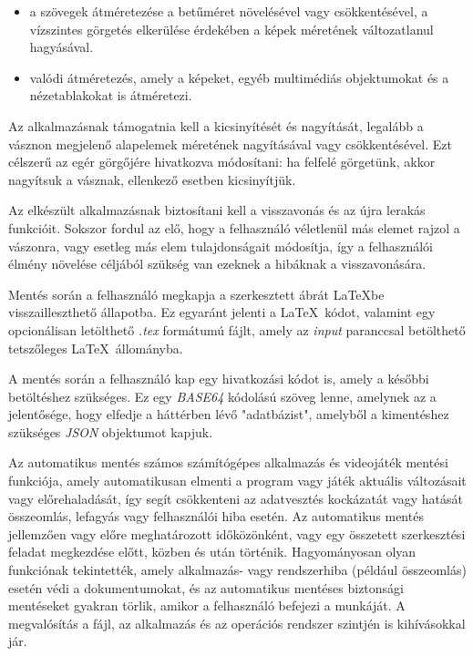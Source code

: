 \begin{itemize}
	\item a szövegek átméretezése a betűméret növelésével vagy csökkentésével, a vízszintes görgetés elkerülése érdekében a képek méretének változatlanul hagyásával.
	\item valódi átméretezés, amely a képeket, egyéb multimédiás objektumokat és a nézetablakokat is átméretezi.
\end{itemize}

Az alkalmazásnak támogatnia kell a kicsinyítését és nagyítását, legalább a vásznon megjelenő alapelemek méretének nagyításával vagy csökkentésével. Ezt célszerű az egér görgőjére hivatkozva módosítani: ha felfelé görgetünk, akkor nagyítsuk a vásznak, ellenkező esetben kicsinyítjük.


Az elkészült alkalmazásnak biztosítani kell a visszavonás és az újra lerakás funkcióit. Sokszor fordul az elő, hogy a felhasználó véletlenül más elemet rajzol a vászonra, vagy esetleg más elem tulajdonságait módosítja, így a felhasználói élmény növelése céljából szükség van ezeknek a hibáknak a visszavonására.



Mentés során a felhasználó megkapja a szerkesztett ábrát \LaTeX\-be visszailleszthető állapotba. Ez egyaránt jelenti a \LaTeX\ kódot, valamint egy opcionálisan letölthető \textit{.tex} formátumú fájlt, amely az \textit{input} paranccsal betölthető tetszőleges \LaTeX\ állományba.

A mentés során a felhasználó kap egy hivatkozási kódot is, amely a későbbi betöltéshez szükséges. Ez egy \textit{BASE64} kódolású szöveg lenne, amelynek az a jelentősége, hogy elfedje a háttérben lévő "adatbázist", amelyből a kimentéshez szükséges \textit{JSON} objektumot kapjuk.


Az automatikus mentés számos számítógépes alkalmazás és videojáték mentési funkciója, amely automatikusan elmenti a program vagy játék aktuális változásait vagy előrehaladását, így segít csökkenteni az adatvesztés kockázatát vagy hatását összeomlás, lefagyás vagy felhasználói hiba esetén. Az automatikus mentés jellemzően vagy előre meghatározott időközönként, vagy egy összetett szerkesztési feladat megkezdése előtt, közben és után történik. Hagyományosan olyan funkciónak tekintették, amely alkalmazás- vagy rendszerhiba (például összeomlás) esetén védi a dokumentumokat, és az automatikus mentéses biztonsági mentéseket gyakran törlik, amikor a felhasználó befejezi a munkáját. A megvalósítás a fájl, az alkalmazás és az operációs rendszer szintjén is kihívásokkal jár.

